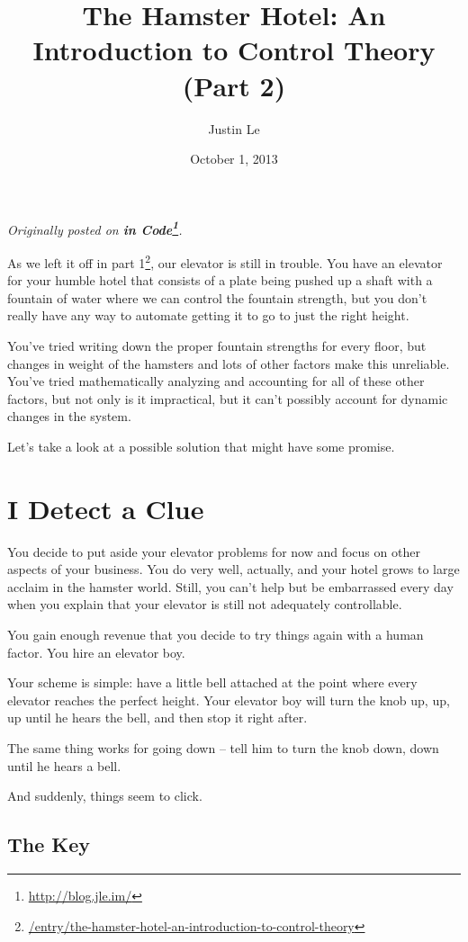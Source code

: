 \documentclass[]{article}
\title{The Hamster Hotel: An Introduction to Control Theory (Part 2)}
\author{Justin Le}
\date{October 1, 2013}
\renewcommand{\href}[2]{#2\footnote{\url{#1}}}
\begin{document}
\maketitle

\emph{Originally posted on \textbf{\href{http://blog.jle.im/}{in
Code}}.}

As we left it off in
\href{/entry/the-hamster-hotel-an-introduction-to-control-theory}{part
1}, our elevator is still in trouble. You have an elevator for your
humble hotel that consists of a plate being pushed up a shaft with a
fountain of water where we can control the fountain strength, but you
don't really have any way to automate getting it to go to just the right
height.

You've tried writing down the proper fountain strengths for every floor,
but changes in weight of the hamsters and lots of other factors make
this unreliable. You've tried mathematically analyzing and accounting
for all of these other factors, but not only is it impractical, but it
can't possibly account for dynamic changes in the system.

Let's take a look at a possible solution that might have some promise.

\section{I Detect a Clue}\label{i-detect-a-clue}

You decide to put aside your elevator problems for now and focus on
other aspects of your business. You do very well, actually, and your
hotel grows to large acclaim in the hamster world. Still, you can't help
but be embarrassed every day when you explain that your elevator is
still not adequately controllable.

You gain enough revenue that you decide to try things again with a human
factor. You hire an elevator boy.

Your scheme is simple: have a little bell attached at the point where
every elevator reaches the perfect height. Your elevator boy will turn
the knob up, up, up until he hears the bell, and then stop it right
after.

The same thing works for going down -- tell him to turn the knob down,
down until he hears a bell.

And suddenly, things seem to click.

\subsection{The Key}\label{the-key}
\end{document}
